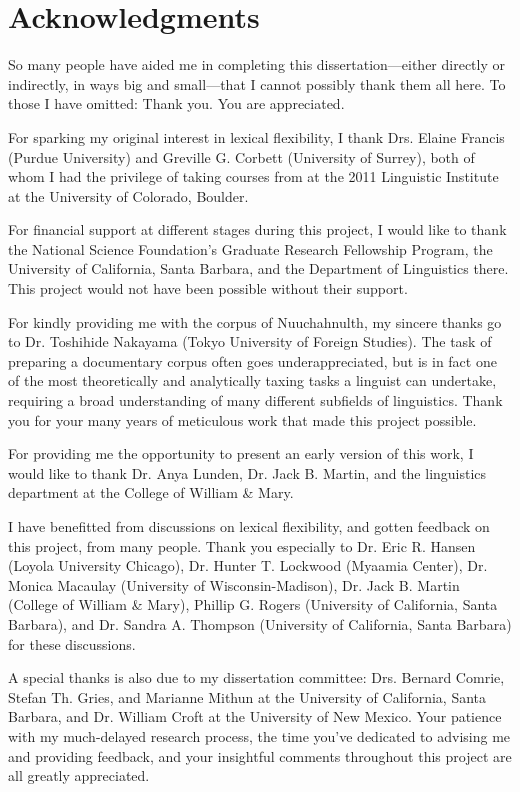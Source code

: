 \clearpage
{}
\section*{Acknowledgments}
\label{sec:acknowledgments}

\singlespacing

So many people have aided me in completing this dissertation—either directly or indirectly, in ways big and small—that I cannot possibly thank them all here. To those I have omitted: Thank you. You are appreciated.

For sparking my original interest in lexical flexibility, I thank Drs. Elaine Francis (Purdue University) and Greville G. Corbett (University of Surrey), both of whom I had the privilege of taking courses from at the 2011 Linguistic Institute at the University of Colorado, Boulder.

For financial support at different stages during this project, I would like to thank the National Science Foundation's Graduate Research Fellowship Program, the University of California, Santa Barbara, and the Department of Linguistics there. This project would not have been possible without their support.

For kindly providing me with the corpus of Nuuchahnulth, my sincere thanks go to Dr. Toshihide Nakayama (Tokyo University of Foreign Studies). The task of preparing a documentary corpus often goes underappreciated, but is in fact one of the most theoretically and analytically taxing tasks a linguist can undertake, requiring a broad understanding of many different subfields of linguistics. Thank you for your many years of meticulous work that made this project possible.

For providing me the opportunity to present an early version of this work, I would like to thank Dr. Anya Lunden, Dr. Jack B. Martin, and the linguistics department at the College of William \& Mary.

I have benefitted from discussions on lexical flexibility, and gotten feedback on this project, from many people. Thank you especially to Dr. Eric R. Hansen (Loyola University Chicago), Dr. Hunter T. Lockwood (Myaamia Center), Dr. Monica Macaulay (University of Wisconsin-Madison), Dr. Jack B. Martin (College of William \& Mary), Phillip G. Rogers (University of California, Santa Barbara), and Dr. Sandra A. Thompson (University of California, Santa Barbara) for these discussions.

A special thanks is also due to my dissertation committee: Drs. Bernard Comrie, Stefan Th. Gries, and Marianne Mithun at the University of California, Santa Barbara, and Dr. William Croft at the University of New Mexico. Your patience with my much-delayed research process, the time you've dedicated to advising me and providing feedback, and your insightful comments throughout this project are all greatly appreciated.

